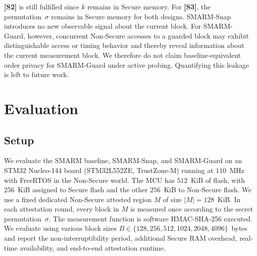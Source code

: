 \documentclass[conference]{IEEEtran}
\newcommand{\smarmcopy}{SMARM-Snap\xspace}
\newcommand{\smarmlock}{SMARM-Guard\xspace}
\newcommand\oak[1]{\textcolor{red}{OAK: #1}}
\begin{document}
\textbf{[S2]} is still fulfilled since $k$ remains in Secure memory.
%
For \textbf{[S3]}, the permutation~$\sigma$ remains in Secure memory
for both designs. \smarmcopy{} introduces no new observable signal
about the current block.
For \smarmlock{}, however, concurrent Non-Secure accesses to a guarded
block may exhibit distinguishable access or timing behavior and thereby
reveal information about the current measurement block. We therefore
do not claim baseline-equivalent order privacy for \smarmlock{} under
active probing.
Quantifying this leakage is left to future work.




\section{Evaluation}
\label{sec:eval}

\subsection{Setup}

We evaluate the SMARM baseline, \smarmcopy{}, and \smarmlock{} on an STM32 Nucleo-144 board (STM32L552ZE, TrustZone-M) running at $110$~MHz with FreeRTOS in the Non-Secure world. The MCU has $512$~KiB of flash, with $256$~KiB assigned to Secure flash and the other $256$~KiB to Non-Secure flash. We use a fixed dedicated Non-Secure attested region
$M$ of size $|M|{=}128$~KiB. In each attestation round, every block
in $M$ is measured once according to the secret permutation~$\sigma$.
The measurement function is software HMAC-SHA-256 executed. We evaluate using various block sizes $B\in\{128,256,512,1024,2048,4096\}$~bytes and report the
non-interruptibility period, additional Secure RAM overhead,
real-time availability, and end-to-end attestation runtime.
\end{document}

